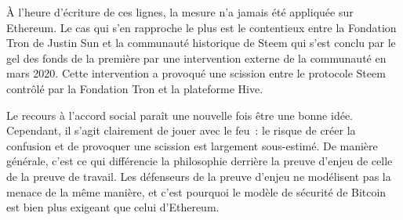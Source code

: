 
À l'heure d'écriture de ces lignes, la mesure n'a jamais été appliquée sur Ethereum. Le cas qui s'en rapproche le plus est le contentieux entre la Fondation Tron de Justin Sun et la communauté historique de Steem qui s'est conclu par le gel des fonds de la première par une intervention externe de la communauté en mars 2020. Cette intervention a provoqué une scission entre le protocole Steem contrôlé par la Fondation Tron et la plateforme Hive.

Le recours à l'accord social paraît une nouvelle fois être une bonne idée. Cependant, il s'agit clairement de jouer avec le feu~: le risque de créer la confusion et de provoquer une scission est largement sous-estimé. De manière générale, c'est ce qui différencie la philosophie derrière la preuve d'enjeu de celle de la preuve de travail. Les défenseurs de la preuve d'enjeu ne modélisent pas la menace de la même manière, et c'est pourquoi le modèle de sécurité de Bitcoin est bien plus exigeant que celui d'Ethereum.

%

